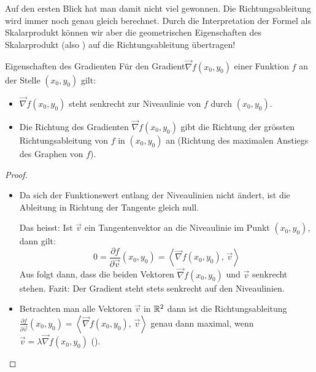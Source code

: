 Auf den ersten Blick hat man damit nicht viel gewonnen. Die Richtungsableitung wird immer noch genau gleich berechnet. Durch die Interpretation der Formel als Skalarprodukt können wir aber die geometrischen Eigenschaften des Skalarprodukt (also ) auf die Richtungsableitung übertragen!

\begin{satz}
	{Eigenschaften des Gradienten}{}
	Für den Gradient$\vec{\nabla} f(x_0, y_0)$ einer Funktion $f$ an der Stelle $(x_0, y_0)$ gilt:
	\begin{itemize}
		\item $\vec{\nabla} f(x_0, y_0)$ steht senkrecht zur Niveaulinie von $f$ durch $(x_0, y_0)$.
		\item Die Richtung des Gradienten $\vec{\nabla} f(x_0, y_0)$ gibt die Richtung der grössten Richtungsableitung von $f$ in $(x_0,y_0)$ an (Richtung des maximalen Anstiegs des Graphen von $f$).
	\end{itemize}
\end{satz}

\begin{proof}
	\begin{itemize}
		\item Da sich der Funktionswert entlang der Niveaulinien nicht ändert, ist die Ableitung in Richtung der Tangente gleich null.

		      Das heisst: Ist \( \vec{v} \) ein Tangentenvektor an die Niveaulinie im Punkt \( (x_0, y_0) \), dann gilt:
		      \[
			      0 =
			      \frac{\partial f}{\partial \vec{v}}(x_0, y_0)
			      = \left\langle \vec{\nabla} f(x_0, y_0),\, \vec{v} \right\rangle
		      \]
		      Aus  folgt dann, dass die beiden Vektoren $\vec{\nabla} f(x_0, y_0)$ und  $\vec{v}$ senkrecht stehen. Fazit: Der Gradient steht stets senkrecht auf den Niveaulinien.
		\item Betrachten man alle Vektoren $\vec{v}$ in $\mathbb{R}^2$ dann ist die Richtungsableitung $\frac{\partial f}{\partial \vec{v}}(x_0, y_0)
			      = \left\langle \vec{\nabla} f(x_0, y_0),\, \vec{v} \right\rangle$ genau dann maximal, wenn $\vec{v} = \lambda  \vec{\nabla} f(x_0, y_0)$ ().

	\end{itemize}
\end{proof}

